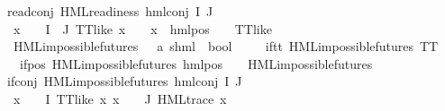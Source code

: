 \begin{isabellebody}
read{\isacharunderscore}{\kern0pt}conj{\isacharcolon}{\kern0pt}\ {\isachardoublequoteopen}HML{\isacharunderscore}{\kern0pt}readiness\ {\isacharparenleft}{\kern0pt}hml{\isacharunderscore}{\kern0pt}conj\ I\ J\ {\isasymPhi}{\isacharparenright}{\kern0pt}{\isachardoublequoteclose}\ \isanewline
{}\ {\isachardoublequoteopen}{\isacharparenleft}{\kern0pt}{\isasymforall}x\ {\isasymin}\ {\isacharparenleft}{\kern0pt}{\isasymPhi}\ {\isacharbackquote}{\kern0pt}\ {\isacharparenleft}{\kern0pt}I\ {\isasymunion}\ J{\isacharparenright}{\kern0pt}{\isacharparenright}{\kern0pt}{\isachardot}{\kern0pt}\ TT{\isacharunderscore}{\kern0pt}like\ x\ {\isasymor}\ {\isacharparenleft}{\kern0pt}{\isasymexists}{\isasymalpha}\ {\isasymchi}{\isachardot}{\kern0pt}\ x\ {\isacharequal}{\kern0pt}\ hml{\isacharunderscore}{\kern0pt}pos\ {\isasymalpha}\ {\isasymchi}\ {\isasymand}\ TT{\isacharunderscore}{\kern0pt}like\ {\isasymchi}{\isacharparenright}{\kern0pt}{\isacharparenright}{\kern0pt}{\isachardoublequoteclose}\isanewline
\isanewline
{}\isamarkupfalse%
\ HML{\isacharunderscore}{\kern0pt}impossible{\isacharunderscore}{\kern0pt}futures\ {\isacharcolon}{\kern0pt}{\isacharcolon}{\kern0pt}\ \ {\isachardoublequoteopen}{\isacharparenleft}{\kern0pt}{\isacharprime}{\kern0pt}a{\isacharcomma}{\kern0pt}\ {\isacharprime}{\kern0pt}s{\isacharparenright}{\kern0pt}hml\ {\isasymRightarrow}\ bool{\isachardoublequoteclose}\isanewline
\ \ \isanewline
\ \ if{\isacharunderscore}{\kern0pt}tt{\isacharcolon}{\kern0pt}\ {\isachardoublequoteopen}HML{\isacharunderscore}{\kern0pt}impossible{\isacharunderscore}{\kern0pt}futures\ TT{\isachardoublequoteclose}\ {\isacharbar}{\kern0pt}\isanewline
\ \ if{\isacharunderscore}{\kern0pt}pos{\isacharcolon}{\kern0pt}\ {\isachardoublequoteopen}HML{\isacharunderscore}{\kern0pt}impossible{\isacharunderscore}{\kern0pt}futures\ {\isacharparenleft}{\kern0pt}hml{\isacharunderscore}{\kern0pt}pos\ {\isasymalpha}\ {\isasymphi}{\isacharparenright}{\kern0pt}{\isachardoublequoteclose}\ \ {\isachardoublequoteopen}HML{\isacharunderscore}{\kern0pt}impossible{\isacharunderscore}{\kern0pt}futures\ {\isasymphi}{\isachardoublequoteclose}\ {\isacharbar}{\kern0pt}\isanewline
if{\isacharunderscore}{\kern0pt}conj{\isacharcolon}{\kern0pt}\ {\isachardoublequoteopen}HML{\isacharunderscore}{\kern0pt}impossible{\isacharunderscore}{\kern0pt}futures\ {\isacharparenleft}{\kern0pt}hml{\isacharunderscore}{\kern0pt}conj\ I\ J\ {\isasymPhi}{\isacharparenright}{\kern0pt}{\isachardoublequoteclose}\isanewline
{}\ {\isachardoublequoteopen}{\isasymforall}x\ {\isasymin}\ {\isacharparenleft}{\kern0pt}{\isasymPhi}\ {\isacharbackquote}{\kern0pt}\ I{\isacharparenright}{\kern0pt}{\isachardot}{\kern0pt}\ TT{\isacharunderscore}{\kern0pt}like\ x{\isachardoublequoteclose}\ {\isachardoublequoteopen}{\isasymforall}x\ {\isasymin}\ {\isacharparenleft}{\kern0pt}{\isasymPhi}\ {\isacharbackquote}{\kern0pt}\ J{\isacharparenright}{\kern0pt}{\isachardot}{\kern0pt}\ {\isacharparenleft}{\kern0pt}HML{\isacharunderscore}{\kern0pt}trace\ x{\isacharparenright}{\kern0pt}{\isachardoublequoteclose}\isanewline

\end{isabellebody}

